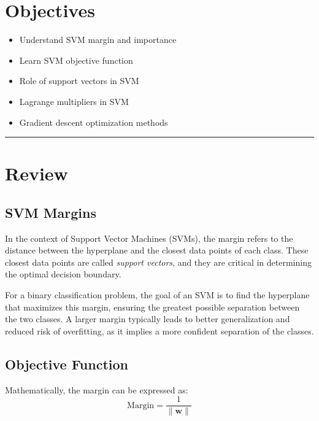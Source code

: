 \section*{Objectives}
\begin{itemize}
    \item Understand SVM margin and importance
    \item Learn SVM objective function
    \item Role of support vectors in SVM
    \item Lagrange multipliers in SVM
    \item Gradient descent optimization methods
\end{itemize}


\rule[0.0051in]{\textwidth}{0.00025in}

\section{Review}
\subsection{SVM Margins}

In the context of Support Vector Machines (SVMs), the margin refers to the distance between the hyperplane and the closest data points of each class. These closest data points are called \textit{support vectors}, and they are critical in determining the optimal decision boundary.

For a binary classification problem, the goal of an SVM is to find the hyperplane that maximizes this margin, ensuring the greatest possible separation between the two classes. A larger margin typically leads to better generalization and reduced risk of overfitting, as it implies a more confident separation of the classes.

\subsection{Objective Function}

Mathematically, the margin can be expressed as:
\[
\text{Margin} = \frac{1}{\| \mathbf{w} \|}
\]

